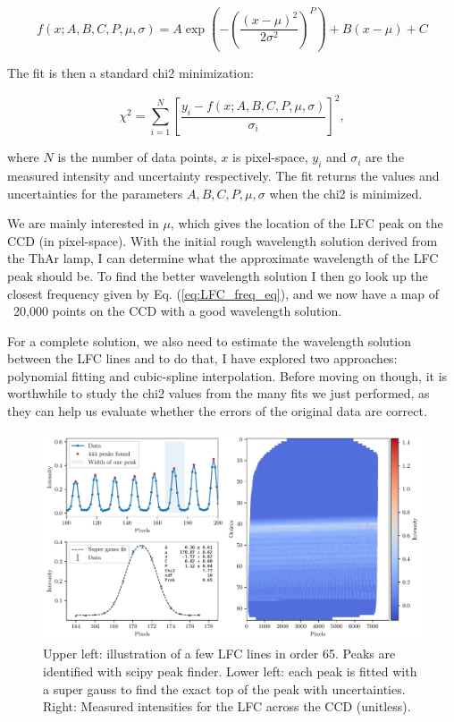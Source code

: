     \begin{equation}
        \label{eq:LFC_super_gauss}
        f(x ; A, B, C, P, \mu, \sigma) = A \exp \left(-\left(\frac{\left(x-\mu\right)^{2}}{2 \sigma^{2}}\right)^{P}\right) + B(x-\mu) + C
    \end{equation}

    The fit is then a standard chi2 minimization:

    \begin{equation}
        \label{eq:chi2_super_gauss}
        \chi^{2}=\sum_{i=1}^{N}\left[\frac{y_{i}-f(x ; A, B, C, P, \mu, \sigma)}{\sigma_{i}}\right]^{2},
    \end{equation}

    where $N$ is the number of data points, $x$ is pixel-space, $y_i$ and $\sigma_i$ are the measured intensity and uncertainty respectively. The fit returns the values and uncertainties for the parameters $A, B, C, P, \mu, \sigma$ when the chi2 is minimized.
    
    We are mainly interested in $\mu$, which gives the location of the LFC peak on the CCD (in pixel-space). With the initial rough wavelength solution derived from the ThAr lamp, I can determine what the approximate wavelength of the LFC peak should be. To find the better wavelength solution I then go look up the closest frequency given by Eq. (\ref{eq:LFC_freq_eq}), and we now have a map of ~20,000 points on the CCD with a good wavelength solution. 
    
    For a complete solution, we also need to estimate the wavelength solution between the LFC lines and to do that, I have explored two approaches: polynomial fitting and cubic-spline interpolation. Before moving on though, it is worthwhile to study the chi2 values from the many fits we just performed, as they can help us evaluate whether the errors of the original data are correct.
    
    \begin{figure}%
        \begin{wide}  
            \includegraphics[width=\textwidth]{figures/LFC_peak_fitting_overview.pdf}
            \caption{Upper left: illustration of a few LFC lines in order 65. Peaks are identified with scipy peak finder. Lower left: each peak is fitted with a super gauss to find the exact top of the peak with uncertainties. Right: Measured intensities for the LFC across the CCD (unitless). }
            \label{fig:LFC_CCD}
        \end{wide}
    \end{figure}

